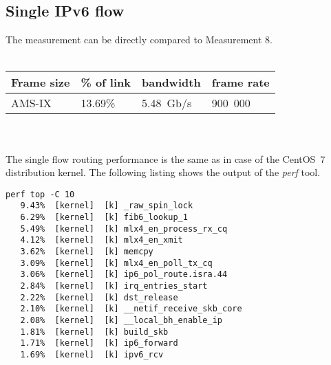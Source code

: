 
\subsection{Single IPv6 flow}
The measurement can be directly compared to Measurement 8.
\\
\\
\begin{tabular}{ | l | l | l | l | }
\hline
Frame size & \% of link & bandwidth & frame rate \\
\hline
AMS-IX & 13.69\% &  5.48~Gb/s & 900~000 \\
\hline
\end{tabular}
\\
\\
The single flow routing performance is the same as in case of the CentOS~7 distribution kernel.
The following listing shows the output of the {\it{perf}} tool.
\begin{lstlisting}
perf top -C 10
   9.43%  [kernel]  [k] _raw_spin_lock
   6.29%  [kernel]  [k] fib6_lookup_1
   5.49%  [kernel]  [k] mlx4_en_process_rx_cq
   4.12%  [kernel]  [k] mlx4_en_xmit
   3.62%  [kernel]  [k] memcpy
   3.09%  [kernel]  [k] mlx4_en_poll_tx_cq
   3.06%  [kernel]  [k] ip6_pol_route.isra.44
   2.84%  [kernel]  [k] irq_entries_start
   2.22%  [kernel]  [k] dst_release
   2.10%  [kernel]  [k] __netif_receive_skb_core
   2.08%  [kernel]  [k] __local_bh_enable_ip
   1.81%  [kernel]  [k] build_skb
   1.71%  [kernel]  [k] ip6_forward
   1.69%  [kernel]  [k] ipv6_rcv
\end{lstlisting}
